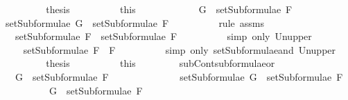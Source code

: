 \begin{isabellebody}
\ \ \ \ \ \ \isamarkupfalse%
\ \isamarkupfalse%
\ {\isacharquery}thesis\isanewline
\ \ \ \ \ \ \ \ \isamarkupfalse%
\ this\isanewline
\ \ \ \ \isamarkupfalse%
\isanewline
\ \ \ \ \ \ \isamarkupfalse%
\ {\isachardoublequoteopen}G\ {\isasymin}\ setSubformulae\ F{}{\isachardoublequoteclose}\isanewline
\ \ \ \ \ \ \isamarkupfalse%
\ \isamarkupfalse%
\ {\isachardoublequoteopen}setSubformulae\ G\ {\isasymsubseteq}\ setSubformulae\ F{}{\isachardoublequoteclose}\isanewline
\ \ \ \ \ \ \ \ \isamarkupfalse%
\ {\isacharparenleft}rule\ assms{\isacharparenleft}{}{\isacharparenright}{\isacharparenright}\isanewline
\ \ \ \ \ \ \isamarkupfalse%
\ \isamarkupfalse%
\ {\isachardoublequoteopen}{\isasymdots}\ {\isasymsubseteq}\ setSubformulae\ F{}\ {\isasymunion}\ setSubformulae\ F{}{\isachardoublequoteclose}\isanewline
\ \ \ \ \ \ \ \ \isamarkupfalse%
\ {\isacharparenleft}simp\ only{\isacharcolon}\ Un{\isacharunderscore}upper{}{\isacharparenright}\isanewline
\ \ \ \ \ \ \isamarkupfalse%
\ \isamarkupfalse%
\ {\isachardoublequoteopen}{\isasymdots}\ {\isasymsubseteq}\ setSubformulae\ {\isacharparenleft}F{}\ \isactrlbold {\isasymand}\ F{}{\isacharparenright}{\isachardoublequoteclose}\isanewline
\ \ \ \ \ \ \ \ \isamarkupfalse%
\ {\isacharparenleft}simp\ only{\isacharcolon}\ setSubformulae{\isacharunderscore}and\ Un{\isacharunderscore}upper{}{\isacharparenright}\isanewline
\ \ \ \ \ \ \isamarkupfalse%
\ \isamarkupfalse%
\ {\isacharquery}thesis\isanewline
\ \ \ \ \ \ \ \ \isamarkupfalse%
\ this\isanewline
\ \ \ \ \isamarkupfalse%
\isanewline
\ \ \isamarkupfalse%
\isanewline
{}\isamarkupfalse%
%
\endisatagproof
{\isafoldproof}%
%
\isadelimproof
\isanewline
%
\endisadelimproof
\isanewline
{}\isamarkupfalse%
\ subContsubformulae{\isacharunderscore}or{\isacharcolon}\isanewline
\ \ \ {\isachardoublequoteopen}G\ {\isasymin}\ setSubformulae\ F{}\ \isanewline
\ \ \ \ \ \ \ \ \ \ \ \ {\isasymLongrightarrow}\ setSubformulae\ G\ {\isasymsubseteq}\ setSubformulae\ F{}{\isachardoublequoteclose}\isanewline
\ \ \ \ \ \ \ \ \ \ {\isachardoublequoteopen}G\ {\isasymin}\ setSubformulae\ F{}\ \isanewline

\end{isabellebody}
